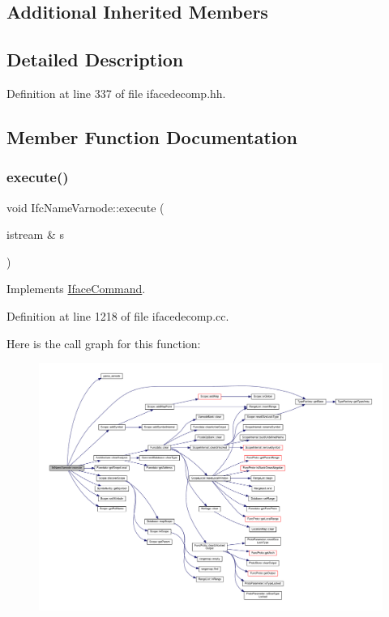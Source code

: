 \subsection*{Additional Inherited Members}


\subsection{Detailed Description}


Definition at line 337 of file ifacedecomp.\+hh.



\subsection{Member Function Documentation}
\mbox{\label{class_ifc_name_varnode_a211fbdeb57899f8999a86b8386b075a6}} 
\subsubsection{\texorpdfstring{execute()}{execute()}}
{\footnotesize\ttfamily void Ifc\+Name\+Varnode\+::execute (\begin{DoxyParamCaption}\item[{istream \&}]{s }\end{DoxyParamCaption})\hspace{0.3cm}{\ttfamily [virtual]}}



Implements \mbox{\hyperlink{class_iface_command_af10e29cee2c8e419de6efe9e680ad201}{Iface\+Command}}.



Definition at line 1218 of file ifacedecomp.\+cc.

Here is the call graph for this function\+:
\nopagebreak
\begin{figure}[H]
\begin{center}
\leavevmode
\includegraphics[width=350pt]{class_ifc_name_varnode_a211fbdeb57899f8999a86b8386b075a6_cgraph}
\end{center}
\end{figure}


